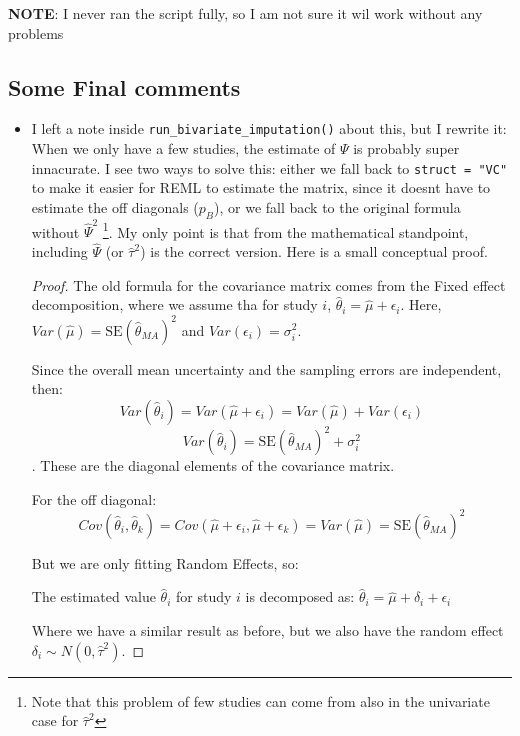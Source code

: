 \documentclass{article}\usepackage[]{graphicx}\usepackage[]{xcolor}
\begin{document}
\textbf{NOTE}: I never ran the script fully, so I am not sure it wil work without any problems 






\subsection{Some Final comments}
\begin{itemize}
	\item I left a note inside \texttt{run\_bivariate\_imputation()} about this, but I rewrite it:
	When we only have a few studies, the estimate of $\Psi$ is probably super innacurate. 
	I see two ways to solve this: either we fall back to \texttt{struct = "VC"} to make it easier for REML to estimate the matrix, since it doesnt have to estimate
	the off diagonals ($p_B$), or we fall back to the original formula without $\hat{\Psi}^2$ \footnote{Note that this problem of few studies can come from also in the univariate case for $\hat{\tau}^2$}. 
	My only point is that from the mathematical standpoint, including $\hat{\Psi}$ (or $\hat{\tau}^2$) is the correct version. Here is a small conceptual proof. 

	\begin{proof}
The old formula for the covariance matrix comes from the Fixed effect decomposition, where we assume tha for study $i$, $\hat{\theta}_i = \hat{\mu} + \epsilon_i$. Here, $Var(\hat{\mu}) = \text{SE}(\hat{\theta}_{MA})^2$ and $Var(\epsilon_i) = \sigma_i^2$. 

Since the overall mean uncertainty and the sampling errors are independent, then: $$Var(\hat{\theta}_i) = Var(\hat{\mu}  + \epsilon_i) = Var(\hat{\mu}) + Var(\epsilon_i)$$
$$Var(\hat{\theta}_i) = \text{SE}(\hat{\theta}_{MA})^2  + \sigma_i^2$$. These are the diagonal elements of the covariance matrix. 

For the off diagonal: 
$$Cov(\hat{\theta}_i, \hat{\theta}_k) = Cov(\hat{\mu}  + \epsilon_i, \hat{\mu}  + \epsilon_k) = Var(\hat{\mu}) = \text{SE}(\hat{\theta}_{MA})^2$$ 



But we are only fitting Random Effects, so: 

The estimated value $\hat{\theta}_i$ for study $i$ is decomposed as:
$\hat{\theta}_i = \hat{\mu}+\delta_i + \epsilon_i$

Where we have a similar result as before, but we also have the random effect $\delta_i \sim N(0, \hat{\tau}^2)$. 


\end{proof}
\end{itemize}
\end{document}
